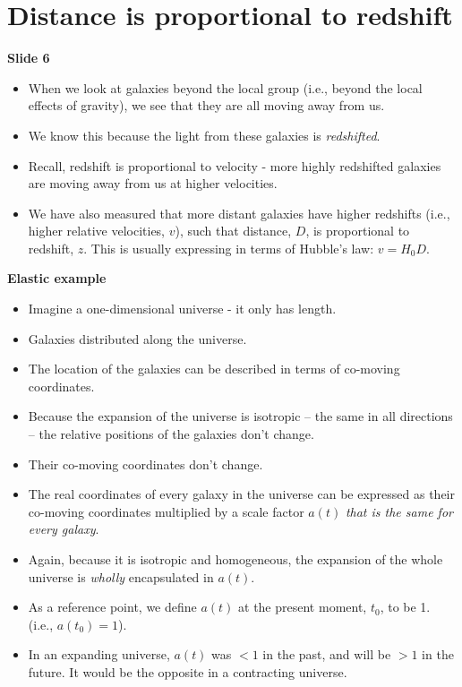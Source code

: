 \documentclass[11pt]{article}
\begin{document}
\section{Distance is proportional to redshift}
{\bf Slide 6}
\begin{itemize}
\item When we look at galaxies beyond the local group (i.e., beyond the local effects of gravity), we see that they are all moving away from us.
\item We know this because the light from these galaxies is {\it redshifted}.
\item Recall, redshift is proportional to velocity - more highly redshifted galaxies are moving away from us at higher velocities.
\item We have also measured that more distant galaxies have higher redshifts (i.e., higher relative velocities, $v$), such that distance, $D$, is proportional to redshift, $z$. This is usually expressing in terms of Hubble's law: $v = H_0D$.
\end{itemize}

\vspace{3mm}
\noindent
{\bf Elastic example}
\begin{itemize}
  \item Imagine a one-dimensional universe - it only has length.
  \item Galaxies distributed along the universe.
  \item The location of the galaxies can be described in terms of co-moving coordinates.
  \item Because the expansion of the universe is isotropic -- the same in all directions -- the relative positions of the galaxies don't change.
  \item Their co-moving coordinates don't change.
  \item The real coordinates of every galaxy in the universe can be expressed as their co-moving coordinates multiplied by a scale factor $a(t)$ {\it that is the same for every galaxy}.
  \item Again, because it is isotropic and homogeneous, the expansion of the whole universe is {\it wholly} encapsulated in $a(t)$.
  \item As a reference point, we define $a(t)$ at the present moment, $t_0$, to be 1. (i.e., $a(t_0)=1$).
  \item In an expanding universe, $a(t)$ was $<1$ in the past, and will be $>1$ in the future. It would be the opposite in a contracting universe.
\end{itemize}
\end{document}
